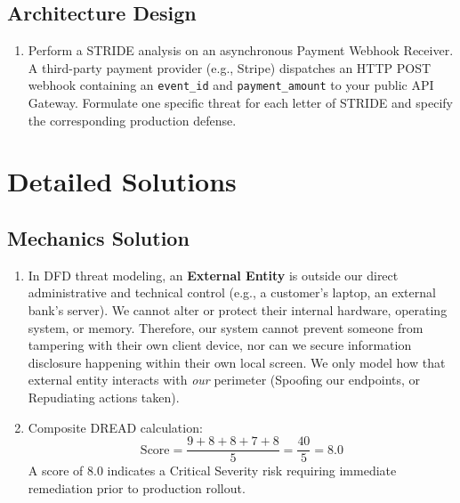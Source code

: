 \subsection*{Architecture Design}
\begin{enumerate}[leftmargin=18pt]
  \item Perform a STRIDE analysis on an asynchronous Payment Webhook Receiver. A third-party payment provider (e.g., Stripe) dispatches an HTTP POST webhook containing an \texttt{event\_id} and \texttt{payment\_amount} to your public API Gateway. Formulate one specific threat for each letter of STRIDE and specify the corresponding production defense.
\end{enumerate}

\section{Detailed Solutions}

\subsection*{Mechanics Solution}
\begin{enumerate}[leftmargin=18pt]
  \item In DFD threat modeling, an \textbf{External Entity} is outside our direct administrative and technical control (e.g., a customer's laptop, an external bank's server). We cannot alter or protect their internal hardware, operating system, or memory. Therefore, our system cannot prevent someone from tampering with their own client device, nor can we secure information disclosure happening within their own local screen. We only model how that external entity interacts with \textit{our} perimeter (Spoofing our endpoints, or Repudiating actions taken).
  
  \item Composite DREAD calculation:
  $$\text{Score} = \frac{9 + 8 + 8 + 7 + 8}{5} = \frac{40}{5} = 8.0$$
  A score of 8.0 indicates a Critical Severity risk requiring immediate remediation prior to production rollout.
\end{enumerate}

